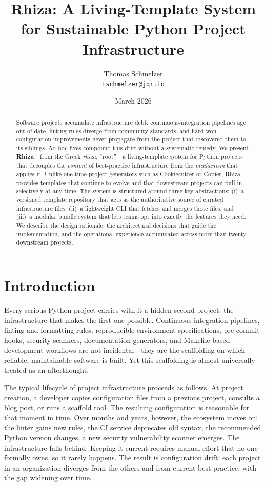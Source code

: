 \documentclass[12pt,a4paper]{article}
\title{\textbf{Rhiza: A Living-Template System for Sustainable Python Project Infrastructure}}
\author{
  Thomas Schmelzer\\
  \texttt{tschmelzer@jqr.io}
}
\date{March 2026}
\begin{document}
\maketitle

\begin{abstract}
Software projects accumulate infrastructure debt: continuous-integration pipelines age out of date, linting rules diverge from community standards, and hard-won configuration improvements never propagate from the project that discovered them to its siblings. Ad-hoc fixes compound this drift without a systematic remedy. We present \textbf{Rhiza}---from the Greek \textit{rhiza}, ``root''---a living-template system for Python projects that decouples the \emph{content} of best-practice infrastructure from the \emph{mechanism} that applies it. Unlike one-time project generators such as Cookiecutter or Copier, Rhiza provides templates that continue to evolve and that downstream projects can pull in selectively at any time. The system is structured around three key abstractions: (i)~a versioned template repository that acts as the authoritative source of curated infrastructure files; (ii)~a lightweight CLI that fetches and merges those files; and (iii)~a modular bundle system that lets teams opt into exactly the features they need. We describe the design rationale, the architectural decisions that guide the implementation, and the operational experience accumulated across more than twenty downstream projects.
\end{abstract}

\tableofcontents
\newpage

\section{Introduction}
\label{sec:intro}

Every serious Python project carries with it a hidden second project: the infrastructure that makes the first one possible. Continuous-integration pipelines, linting and formatting rules, reproducible environment specifications, pre-commit hooks, security scanners, documentation generators, and Makefile-based development workflows are not incidental---they are the scaffolding on which reliable, maintainable software is built. Yet this scaffolding is almost universally treated as an afterthought.

The typical lifecycle of project infrastructure proceeds as follows. At project creation, a developer copies configuration files from a previous project, consults a blog post, or runs a scaffold tool. The resulting configuration is reasonable for that moment in time. Over months and years, however, the ecosystem moves on: the linter gains new rules, the CI service deprecates old syntax, the recommended Python version changes, a new security vulnerability scanner emerges. The infrastructure falls behind. Keeping it current requires manual effort that no one formally owns, so it rarely happens. The result is configuration drift: each project in an organization diverges from the others and from current best practice, with the gap widening over time.
\end{document}
